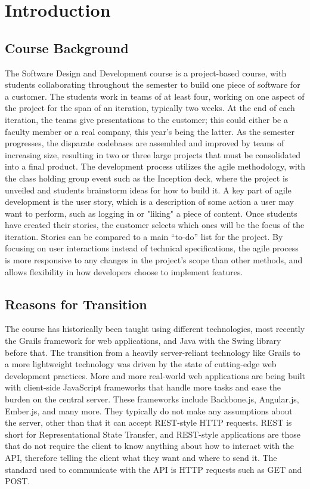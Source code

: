 \documentclass[12pt]{article}
\begin{document}
\newpage

\setcounter{page}{1}


\section{Introduction}\label{sec:introduction}
\subsection{Course Background}\label{sec:course_background}
 The Software Design and Development course is a project-based course, with students collaborating throughout the semester to build one piece of software for a customer. The students work in teams of at least four, working on one aspect of the project for the span of an iteration, typically two weeks. At the end of each iteration, the teams give presentations to the customer; this could either be a faculty member or a real company, this year's being the latter. As the semester progresses, the disparate codebases are assembled and improved by teams of increasing size, resulting in two or three large projects that must be consolidated into a final product. The development process utilizes the agile methodology, with the class holding group event such as the Inception deck, where the project is unveiled and students brainstorm ideas for how to build it. A key part of agile development is the user story, which is a description of some action a user may want to perform, such as logging in or "liking" a piece of content. Once students have created their stories, the customer selects which ones will be the focus of the iteration. Stories can be compared to a main ``to-do'' list for the project. By focusing on user interactions instead of technical specifications, the agile process is more responsive to any changes in the project's scope than other methods, and allows flexibility in how developers choose to implement features.



\subsection{Reasons for Transition}\label{sec:reasons_for_transition}
The course has historically been taught using different technologies, most recently the Grails framework for web applications, and Java with the Swing library before that. The transition from a heavily server-reliant technology like Grails to a more lightweight technology was driven by the state of cutting-edge web development practices. More and more real-world web applications are being built with client-side JavaScript frameworks that handle more tasks and ease the burden on the central server. These frameworks include Backbone.js, Angular.js, Ember.js, and many more. They typically do not make any assumptions about the server, other than that it can accept REST-style HTTP requests. REST is short for Representational State Transfer, and REST-style applications are those that do not require the client to know anything about how to interact with the API, therefore telling the client what they want and where to send it. The standard used to communicate with the API is HTTP requests such as GET and POST.
\end{document}
